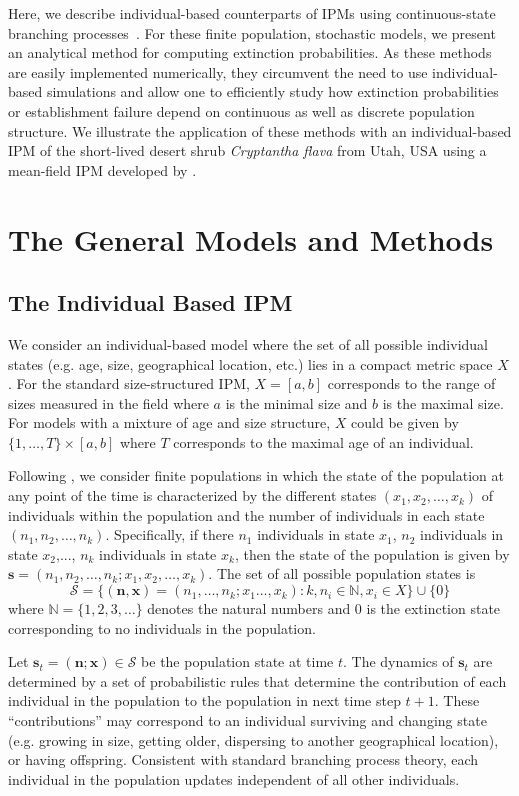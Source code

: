 \documentclass[12pt]{amsart}\usepackage[]{graphicx}\usepackage[]{color}
\def\N{\mathbb N}
\def\N{\mathbb N}
\def\S{\mathcal S}
\def\n{\mathbf n}
\def\x{\mathbf x}
\def\s{\mathbf s}
\begin{document}
Here, we describe individual-based counterparts of IPMs using continuous-state branching processes~\citep{harris-63}. For these finite population, stochastic models, we present an analytical method for computing extinction probabilities. As these methods are easily implemented numerically, they circumvent the need to use individual-based simulations and allow one to efficiently study how extinction probabilities or establishment failure depend on continuous as well as discrete population structure. We illustrate the application of these methods with an individual-based IPM of the short-lived desert shrub \emph{Cryptantha flava} from Utah, USA using a mean-field IPM developed by \citet{salguero-etal-12}.


\section*{The General Models and Methods}


\subsection*{The Individual Based IPM}
We consider an individual-based model where the set of all possible individual states (e.g. age, size, geographical location, etc.) lies in a compact metric space $X$. For the standard size-structured IPM, $X=[a,b]$ corresponds to the range of sizes measured in the field where $a$ is the minimal size and $b$ is the maximal size. For models with a mixture of age and size structure, $X$ could be given by $\{1,\dots,T\}\times [a,b]$ where $T$ corresponds to the maximal age of an individual.

Following \citet{harris-63},  we consider finite populations in which the state of the population at any point of the time is characterized by the different states $(x_1,x_2,\dots, x_k)$  of individuals within the population and the number of individuals in each state $(n_1,n_2,\dots, n_k)$. Specifically, if there $n_1$ individuals in state $x_1$, $n_2$ individuals in state $x_2$,..., $n_k$ individuals in state $x_k$, then the state of the population is given by $\s=(n_1,n_2,\dots, n_k; x_1,x_2,\dots, x_k)$. The set of all possible population states is
\[
\S= \{(\n,\x)=(n_1,\dots, n_k; x_1\dots , x_k): k,n_i\in \N, x_i \in X\} \cup \{0\}
\]
where $\N=\{1,2,3,\dots\}$ denotes the natural numbers and $0$ is the extinction state corresponding to no individuals in the population.

Let  $\s_t=( \n; \x)\in \S$ be the population state at time $t$. The dynamics of $\s_t$ are determined by a set of probabilistic rules that determine the contribution of each individual in the population to the population in next time step $t+1$. These ``contributions'' may correspond to an individual surviving and changing state (e.g. growing in size, getting older, dispersing to another geographical location), or having offspring.  Consistent with standard branching process theory, each individual in the population updates independent of all other individuals.
\end{document}
